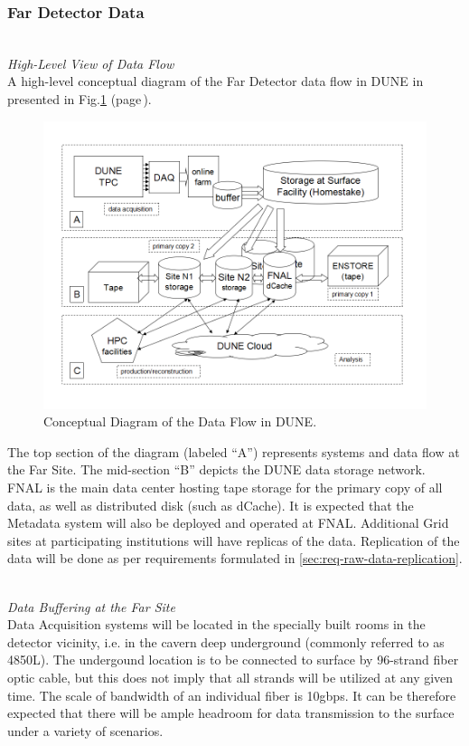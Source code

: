 \subsubsection{Far Detector Data}
\ 
\\
\noindent
\textit{High-Level View of Data Flow} 
\ 
\\
\noindent
A high-level conceptual diagram of the Far Detector data flow in DUNE in presented in Fig.\ref{fig:DUNEdataflow}
(page\,\pageref{fig:DUNEdataflow}).
\begin{figure}[h!]
\centering
\includegraphics[width=\textwidth]{DUNEdataflow.png}
\caption{Conceptual Diagram of the Data Flow in DUNE.}
\label{fig:DUNEdataflow}
\end{figure}
The top section of the diagram (labeled ``A'') represents systems and data flow at the Far Site.
The mid-section ``B'' depicts the DUNE data storage network. FNAL is the main data center
hosting tape storage for the primary copy of all data, as well as distributed disk (such as dCache).
It is expected that the Metadata system will also be deployed and operated at FNAL.
Additional Grid sites at participating institutions will have replicas of the data.
Replication of the data will be done as per requirements formulated in \ref{sec:req-raw-data-replication}.

\ 
\\

\noindent
\textit{Data Buffering at the Far Site} 
\ 
\\
\noindent
Data Acquisition systems will be located in the specially built rooms in the detector vicinity,
i.e. in the cavern deep underground (commonly referred to as 4850L). The undergound location is to be
connected to surface by 96-strand fiber optic cable, but this does not imply that all strands will be
utilized at any given time. The scale of bandwidth of an individual fiber is 10gbps. It can be therefore
expected that there will be ample headroom for data transmission to the surface under a variety of scenarios.

